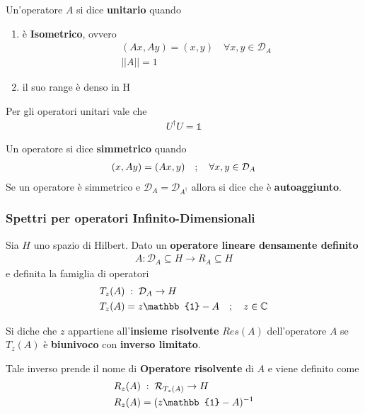 Un'operatore $A$ si dice \textbf{unitario} quando
\begin{enumerate}
	\item è \textbf{Isometrico}, ovvero 
	\begin{align}
		&(Ax,Ay) = (x,y) \quad \forall x,y \in \mathcal{D}_A\\
		&||A|| = 1
	\end{align}
	\item il suo range è denso in H
\end{enumerate} 
Per gli operatori unitari vale che
\begin{align}
	U^\dagger U = \mathbb{1}
\end{align}

Un operatore si dice \textbf{simmetrico} quando
\begin{align}
	(x,Ay) = (Ax,y) \quad ; \quad \forall x,y \in \mathcal{D}_A
\end{align}
Se un operatore è simmetrico e $\mathcal{D}_A = \mathcal{D}_{A^\dagger}$ allora si dice che è \textbf{autoaggiunto}.


\subsubsection{Spettri per operatori Infinito-Dimensionali}

Sia $H$ uno spazio di Hilbert. Dato un \textbf{operatore lineare densamente definito}
\begin{align}
	A : \mathcal{D}_A \subseteq H \rightarrow R_A \subseteq H
\end{align} 
e definita la famiglia di operatori
\begin{align}
	&T_z(A) \taleche \mathcal{D}_A \rightarrow H\\
	&T_z(A) = z\mathbb{1} - A \spacer z \in \C
\end{align}


Si diche che $z$ appartiene all'\textbf{insieme risolvente} $Res(A)$ dell'operatore $A$ se $T_z (A)$ è \textbf{biunivoco} con \textbf{inverso limitato}.

Tale inverso prende il nome di \textbf{Operatore risolvente} di $A$ e viene definito come
\begin{align}
	&R_z(A) \taleche \mathcal{R}_{T_z(A)} \rightarrow H\\
	&R_z(A) = (z\mathbb{1} - A)^{-1}
\end{align}

